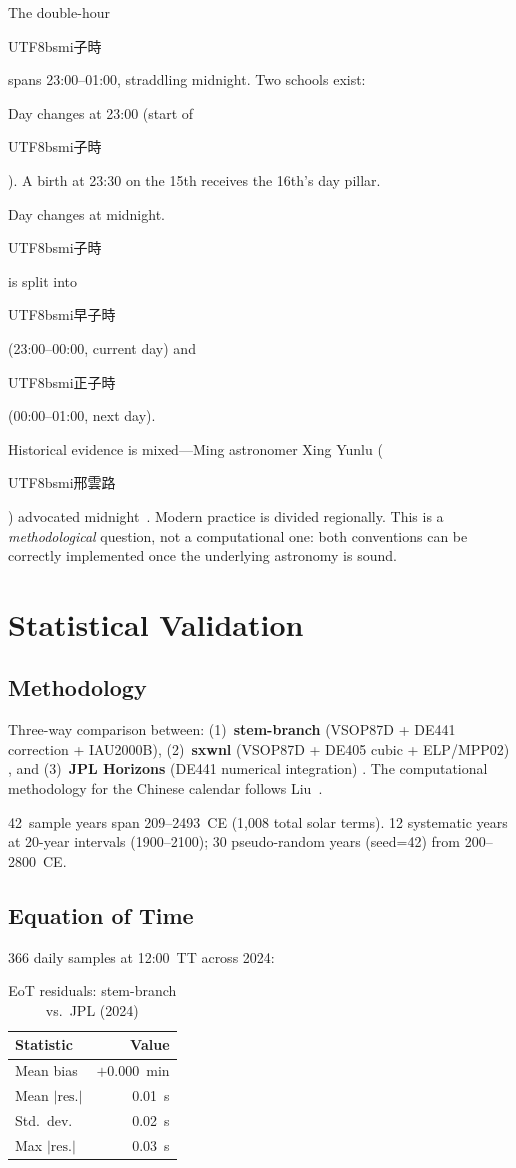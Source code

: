 \documentclass[10pt,a4paper]{article}
\newcommand{\zh}[1]{\begin{CJK}{UTF8}{bsmi}#1\end{CJK}}
\begin{document}
The double-hour \zh{子時} spans 23:00--01:00, straddling midnight. Two
schools exist:

\begin{description}[leftmargin=0pt]
  \item[\zh{子初換日}:] Day changes at 23:00 (start of \zh{子時}).
    A birth at 23:30 on the 15th receives the 16th's day pillar.
  \item[\zh{子正換日}:] Day changes at midnight. \zh{子時} is split
    into \zh{早子時} (23:00--00:00, current day) and \zh{正子時}
    (00:00--01:00, next day).
\end{description}

Historical evidence is mixed---Ming astronomer Xing Yunlu (\zh{邢雲路})
advocated midnight~\cite{xing_yunlu}. Modern practice is divided regionally. This is a
\emph{methodological} question, not a computational one: both conventions
can be correctly implemented once the underlying astronomy is sound.

\section{Statistical Validation}
\label{sec:validation}

\subsection{Methodology}

Three-way comparison between: (1)~\textbf{stem-branch} (VSOP87D + DE441
correction + IAU2000B), (2)~\textbf{sxwnl} (VSOP87D + DE405 cubic +
ELP/MPP02) \cite{sxwnl_github}, and (3)~\textbf{JPL Horizons} (DE441
numerical integration) \cite{jpl_horizons}. The computational methodology
for the Chinese calendar follows Liu~\cite{ytliu_computation}.

42~sample years span 209--2493~CE (1,008 total solar terms). 12 systematic
years at 20-year intervals (1900--2100); 30 pseudo-random years (seed=42)
from 200--2800~CE.

\subsection{Equation of Time}
\label{subsec:eot}

366 daily samples at 12:00~TT across 2024:

\begin{table}[H]
\centering
\caption{EoT residuals: stem-branch vs.\ JPL (2024)}
\label{tab:eot}
\footnotesize
\begin{tabular}{lr}
\toprule
\textbf{Statistic} & \textbf{Value} \\
\midrule
Mean bias & $+0.000$~min \\
Mean $|\text{res.}|$ & 0.01~s \\
Std.\ dev. & 0.02~s \\
Max $|\text{res.}|$ & 0.03~s \\
\bottomrule
\end{tabular}
\end{table}
\end{document}
